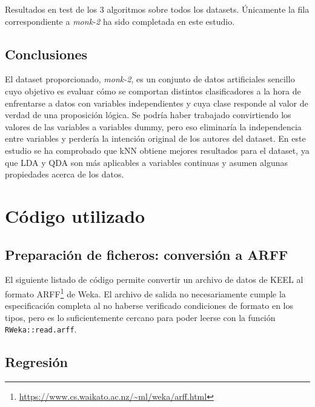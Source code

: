 \documentclass[a4paper, 11pt]{article}
\begin{document}
\begin{table}[ht]
  \caption{\label{tbl:clasresall}Resultados en test de los 3 algoritmos sobre todos los datasets. Únicamente la fila correspondiente a \textit{monk-2} ha sido completada en este estudio.}
  
  
\end{table}

\subsection{Conclusiones}

El dataset proporcionado, \textit{monk-2}, es un conjunto de datos artificiales sencillo cuyo objetivo es evaluar cómo se comportan distintos clasificadores a la hora de enfrentarse a datos con variables independientes y cuya clase responde al valor de verdad de una proposición lógica. Se podría haber trabajado convirtiendo los valores de las variables a variables dummy, pero eso eliminaría la independencia entre variables y perdería la intención original de los autores del dataset. En este estudio se ha comprobado que kNN obtiene mejores resultados para el dataset, ya que LDA y QDA son más aplicables a variables continuas y asumen algunas propiedades acerca de los datos. 

\clearpage
\appendix

\section{Código utilizado}

\subsection{Preparación de ficheros: conversión a ARFF}
\label{sec:code:conv}

El siguiente listado de código permite convertir un archivo de datos de KEEL al formato ARFF\footnote{\url{https://www.cs.waikato.ac.nz/~ml/weka/arff.html}} de Weka. El archivo de salida no necesariamente cumple la especificación completa al no haberse verificado condiciones de formato en los tipos, pero es lo suficientemente cercano para poder leerse con la función \texttt{RWeka::read.arff}.


\subsection{Regresión}
\label{sec:code:regr}
\end{document}
